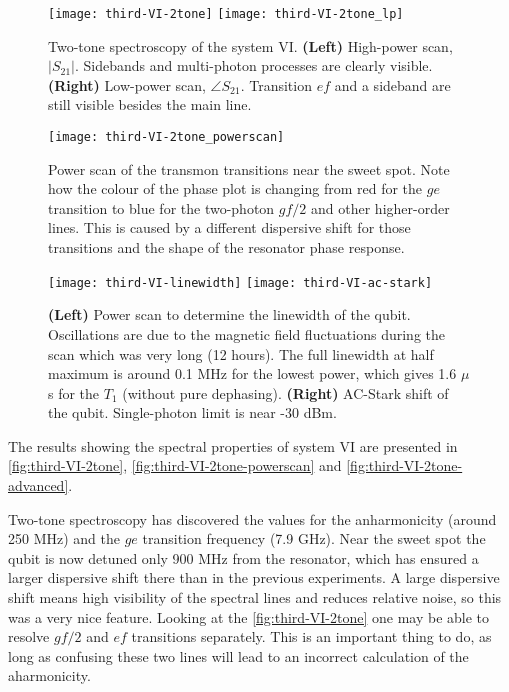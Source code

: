 \documentclass[12pt, twoside]{report}
\numberwithin{equation}{section}
\begin{document}
\begin{figure}
\centering
\texttt{[image: third-VI-2tone]} \quad \texttt{[image: third-VI-2tone\_lp]}
\caption{Two-tone spectroscopy of the system VI. \textbf{(Left)} High-power scan, $|S_{21}|$. Sidebands and multi-photon processes are clearly visible. \textbf{(Right)} Low-power scan, $\angle S_{21}$. Transition $ef$ and a sideband are still visible besides the main line.}
\label{fig:third-VI-2tone}
\end{figure}
\begin{figure}
\centering
\texttt{[image: third-VI-2tone\_powerscan]}
\caption{Power scan of the transmon transitions near the sweet spot. Note how the colour of the phase plot is changing from red for the $ge$ transition to blue for the two-photon $gf/2$ and other higher-order lines. This is caused by a different dispersive shift for those transitions and the shape of the resonator phase response.}
\label{fig:third-VI-2tone-powerscan}
\end{figure}
\begin{figure}[h!]
\centering
\texttt{[image: third-VI-linewidth]} \quad 
\texttt{[image: third-VI-ac-stark]}
\caption{\textbf{(Left)} Power scan to determine the linewidth of the qubit. Oscillations are due to the magnetic field fluctuations during the scan which was very long (12 hours). The full linewidth at half maximum is around 0.1 MHz for the lowest power, which gives 1.6 $\mu$s for the $T_1$ (without pure dephasing). \textbf{(Right)} AC-Stark shift of the qubit. Single-photon limit is near -30 dBm.}
\label{fig:third-VI-2tone-advanced}
\end{figure}

The results showing the spectral properties of system VI are presented in \autoref{fig:third-VI-2tone}, \autoref{fig:third-VI-2tone-powerscan} and \autoref{fig:third-VI-2tone-advanced}. 

Two-tone spectroscopy has discovered the values for the anharmonicity (around 250 MHz) and the $ge$ transition frequency (7.9 GHz). Near the sweet spot the qubit is now detuned only 900 MHz from the resonator, which has ensured a larger dispersive shift there than in the previous experiments. A large dispersive shift means high visibility of the spectral lines and reduces relative noise, so this was a very nice feature. Looking at the \autoref{fig:third-VI-2tone} one may be able to resolve $gf/2$ and $ef$ transitions separately. This is an important thing to do, as long as confusing these two lines will lead to an incorrect calculation of the aharmonicity.
\end{document}
